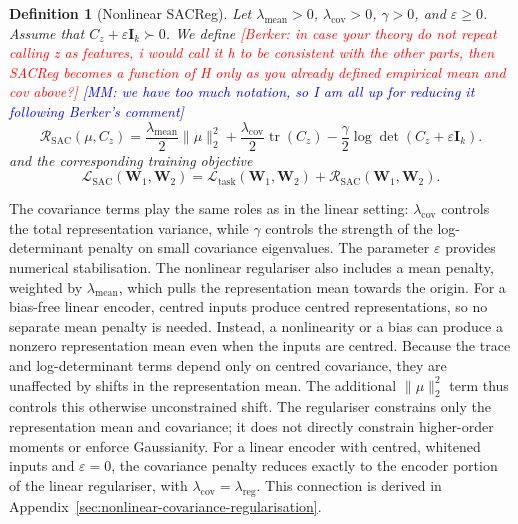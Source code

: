 \documentclass{article} %
\newcommand{\wa}{\mathbf{W}_1}
\newcommand{\wb}{\mathbf{W}_2}
\newtheorem{definition}[theorem]{Definition}
\theoremstyle{remark}
\newcommand{\BD}[1]{\textcolor{red}{[Berker: #1]}}
\newcommand{\mm}[1]{\textcolor{blue}{[MM: #1]}}
\begin{document}
\begin{definition}[Nonlinear SACReg]
\label{def:nonlinear-encoder-regulariser}
Let $\lambda_{\mathrm{mean}}>0$,
$\lambda_{\mathrm{cov}}>0$, $\gamma>0$, and $\varepsilon\geq0$.
Assume that $C_z+\varepsilon\mathbf{I}_k\succ0$.
We define \BD{in case your theory do not repeat calling z as features, i would call it h to be consistent with the other parts, then SACReg becomes a function of H only as you already defined empirical mean and cov above?} \mm{we have too much notation, so I am all up for reducing it following Berker's comment}
\begin{equation}
\mathcal{R}_{\mathrm{SAC}}(\mu,C_z)
=
\frac{\lambda_{\mathrm{mean}}}{2}\|\mu\|_2^2
+
\frac{\lambda_{\mathrm{cov}}}{2}\operatorname{tr}(C_z)
-
\frac{\gamma}{2}
\log\det\left(C_z+\varepsilon\mathbf{I}_k\right).
\label{eq:nonlinear-covariance-regulariser}
\end{equation}
and the
corresponding training objective  $$\mathcal{L}_{\mathrm{SAC}}(\wa,\wb)
=
\mathcal{L}_{\mathrm{task}}(\wa,\wb)
+
\mathcal{R}_{\mathrm{SAC}}(\wa,\wb).$$
\end{definition}
The covariance terms play the same roles as in the linear setting: $\lambda_{\mathrm{cov}}$ controls the total representation variance, while $\gamma$ controls the strength of the log-determinant penalty on small covariance eigenvalues. The parameter $\varepsilon$ provides numerical stabilisation. The nonlinear regulariser also includes a mean penalty, weighted by $\lambda_{\mathrm{mean}}$, which pulls the representation mean towards the origin. For a bias-free linear encoder, centred inputs produce centred representations, so no separate mean penalty is needed. Instead, a nonlinearity or a bias can produce a nonzero representation mean even when the inputs are centred. Because the trace and log-determinant terms depend only on centred covariance, they are unaffected by shifts in the representation mean. The additional $\|\mu\|_2^2$ term thus controls this otherwise unconstrained shift.
The regulariser constrains only the representation mean and
covariance; it does not directly constrain higher-order moments
or enforce Gaussianity. For a linear encoder with centred, whitened inputs and $\varepsilon=0$, the covariance penalty reduces exactly to the encoder portion of the linear regulariser, with $\lambda_{\mathrm{cov}}=\lambda_{\mathrm{reg}}$. This connection is derived in Appendix~\ref{sec:nonlinear-covariance-regularisation}.
\end{document}
